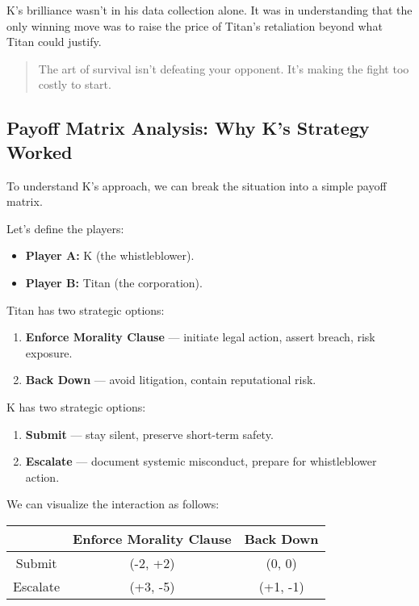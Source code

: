 \medskip

K’s brilliance wasn’t in his data collection alone.
It was in understanding that the only winning move was to raise the price of Titan’s retaliation beyond what Titan could justify.

\begin{quote}
    The art of survival isn’t defeating your opponent. It’s making the fight too costly to start.
\end{quote}



\subsection{Payoff Matrix Analysis: Why K’s Strategy Worked}

To understand K’s approach, we can break the situation into a simple payoff matrix.

Let’s define the players:

\begin{itemize}
    \item \textbf{Player A:} K (the whistleblower).
    \item \textbf{Player B:} Titan (the corporation).
\end{itemize}

Titan has two strategic options:

\begin{enumerate}
    \item \textbf{Enforce Morality Clause} — initiate legal action, assert breach, risk exposure.
    \item \textbf{Back Down} — avoid litigation, contain reputational risk.
\end{enumerate}

K has two strategic options:

\begin{enumerate}
    \item \textbf{Submit} — stay silent, preserve short-term safety.
    \item \textbf{Escalate} — document systemic misconduct, prepare for whistleblower action.
\end{enumerate}

\medskip

We can visualize the interaction as follows:

\begin{center}
\begin{tabular}{|c|c|c|}
\hline
 & Enforce Morality Clause & Back Down \\
\hline
Submit & (-2, +2) & (0, 0) \\
\hline
Escalate & (+3, -5) & (+1, -1) \\
\hline
\end{tabular}
\end{center}

